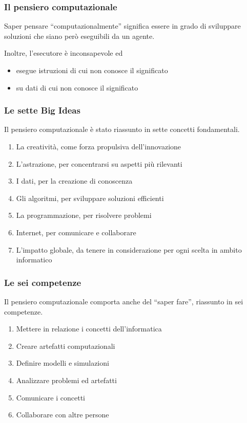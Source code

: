 \documentclass[
    hyperref={colorlinks,citecolor=black,linkcolor=black,urlcolor=blue}
]{beamer}
\begin{document}
\begin{frame}
  \frametitle{Il pensiero computazionale}

  Saper pensare ``computazionalmente'' significa essere in grado di sviluppare soluzioni che siano però eseguibili da un agente.
  
  \vspace{1em}

  Inoltre, l'esecutore è inconsapevole ed
  \begin{itemize}
    \item esegue istruzioni di cui non conosce il significato
    \item su dati di cui non conosce il significato
  \end{itemize}
\end{frame}

\begin{frame}
  \frametitle{Le sette Big Ideas}

  Il pensiero computazionale è stato riassunto in sette concetti fondamentali.
  
  \begin{enumerate}
    \item La creatività, come forza propulsiva dell'innovazione
    \item L'astrazione, per concentrarsi su aspetti più rilevanti
    \item I dati, per la creazione di conoscenza
    \item Gli algoritmi, per sviluppare soluzioni efficienti
    \item La programmazione, per risolvere problemi
    \item Internet, per comunicare e collaborare
    \item L'impatto globale, da tenere in considerazione per ogni scelta in ambito informatico
  \end{enumerate}
\end{frame}

\begin{frame}
  \frametitle{Le sei competenze}

  Il pensiero computazionale comporta anche del ``saper fare'', riassunto in sei competenze.
  
  \begin{enumerate}
    \item Mettere in relazione i concetti dell'informatica
    \item Creare artefatti computazionali
    \item Definire modelli e simulazioni
    \item Analizzare problemi ed artefatti
    \item Comunicare i concetti
    \item Collaborare con altre persone
  \end{enumerate}
\end{frame}
\end{document}
